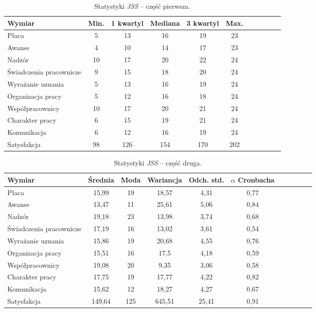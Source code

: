 \begin{table}[h!]
\begin{center}
\begin{tabular}{l | c c c c c c c c c c}
Wymiar & Min. & 1 kwartyl & Mediana & 3 kwartyl & Max.\\ \hline \hline
Płaca & 5 & 13 & 16 & 19 & 23 \\ 
Awanse & 4 & 10 & 14 & 17 & 23 \\
Nadzór & 10 & 17 & 20 & 22 & 24 \\
Świadczenia pracownicze & 9 & 15 & 18 & 20 & 24 \\
Wyrażanie uznania & 5 & 13 & 16 & 19 & 24 \\
Organizacja pracy & 5 & 12 & 16 & 18 & 24 \\
Współpracownicy & 10 & 17 & 20 & 21 & 24 \\
Charakter pracy & 6 & 15 & 19 & 21 & 24 \\
Komunikacja & 6 & 12 & 16 & 19 & 24 \\ \hline
Satysfakcja & 98 & 126 & 154 & 170 & 202 \\ \hline
\end{tabular}
\end{center}
\caption{Statystyki \emph{JSS} -- część pierwsza.}
\label{tab:jss-stats-1}
\end{table}

\begin{table}[h!]
\begin{center}
\begin{tabular}{l | c c c c c c c c c c}
Wymiar & Średnia & Moda & Wariancja & Odch. std. & $\alpha$ Cronbacha\\ \hline \hline
Płaca & 15,99 & 19 & 18,57 & 4,31 & 0,77 \\
Awanse & 13,47 & 11 & 25,61 & 5,06 & 0,84 \\
Nadzór & 19,18 & 23 & 13,98 & 3,74 & 0,68 \\
Świadczenia pracownicze & 17,19 & 16 & 13,02 & 3,61 & 0,54 \\
Wyrażanie uznania & 15,86 & 19 & 20,68 & 4,55 & 0,76 \\
Organizacja pracy & 15,51 & 16 & 17,5 & 4,18 & 0,59 \\
Współpracownicy & 19,08 & 20 & 9,35 & 3,06 & 0,58 \\
Charakter pracy & 17,75 & 19 & 17,77 & 4,22 & 0,82 \\
Komunikacja & 15,62 & 12 & 18,27 & 4,27 & 0,67 \\ \hline
Satysfakcja & 149,64 & 125 & 645,51 & 25,41 & 0,91 \\ \hline
\end{tabular}
\end{center}
\caption{Statystyki \emph{JSS} -- część druga.}
\label{tab:jss-stats-2}
\end{table}

